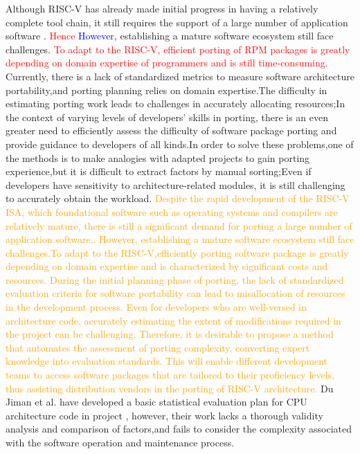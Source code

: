 \documentclass[sigconf,screen,review,anonymous]{acmart}
\begin{document}
Although RISC-V has already made initial progress in having a relatively complete tool chain, it still requires the support of a large number of application software \cite{2019Notary}.
\textcolor{red}{Hence} \textcolor{blue}{However}, establishing a mature software ecosystem still face challenges. \textcolor{red}{To adapt to the RISC-V, efficient porting of RPM packages is greatly depending on domain expertise of programmers and is still time-consuming.}
Currently, there is a lack of standardized metrics to measure software architecture portability,and porting planning relies on domain expertise.The difficulty in estimating porting work leads to challenges in accurately allocating resources;In the context of varying levels of developers' skills in porting, there is an even greater need to efficiently assess the difficulty of software package porting and provide guidance to developers of all kinds.In order to solve these problems,one of the methods is to make analogies with adapted projects to gain porting experience,but it is difficult to extract factors by manual sorting;Even if developers have sensitivity to architecture-related modules, it is still challenging to accurately obtain the workload. 
\textcolor{orange}{Despite the rapid development of the RISC-V ISA, which foundational software such as operating systems and compilers are relatively mature, there is still a significant demand for porting a large number of application software.\citep{2019Notary}. However, establishing a mature software ecosystem still face challenges.To adapt to the RISC-V,efficiently porting software package is greatly depending on domain expertise and is characterized by significant costs and resources. During the initial planning phase of porting, the lack of standardized evaluation criteria for software portability can lead to misallocation of resources in the development process. Even for developers who are well-versed in architecture code, accurately estimating the extent of modifications required in the project can be challenging. Therefore, it is desirable to propose a method that automates the assessment of porting complexity, converting expert knowledge into evaluation standards. This will enable different development teams to access software packages that are tailored to their proficiency levels, thus assisting distribution vendors in the porting of RISC-V architecture.}
Du Jiman et al. have developed a basic statistical evaluation plan for CPU architecture code in project \cite{2023du}, however, their work lacks a thorough validity analysis and comparison of factors,and fails to consider the complexity associated with the software operation and maintenance process.
\end{document}
